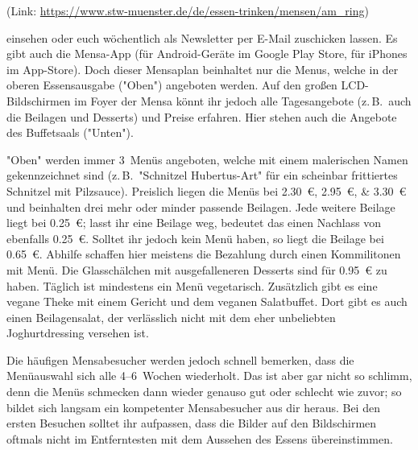 \begin{multicols*}{2}
\begin{center}
	(Link:
	\url{https://www.stw-muenster.de/de/essen-trinken/mensen/am_ring})
\end{center}

einsehen oder euch wöchentlich als Newsletter per E-Mail zuschicken lassen.
Es gibt auch die Mensa-App (für Android-Geräte im Google Play Store, für iPhones im App-Store).
Doch dieser Mensaplan beinhaltet nur die Menus, welche in der oberen Essensausgabe ("Oben") angeboten werden.
Auf den großen LCD-Bildschirmen im Foyer der Mensa könnt ihr jedoch alle Tagesangebote (z.\,B.\ auch die Beilagen und Desserts) und Preise erfahren.
Hier stehen auch die Angebote des Buffetsaals ("Unten").

"Oben" werden immer 3~Menüs angeboten, welche mit einem malerischen Namen gekennzeichnet sind (z.\,B.\ "Schnitzel Hubertus-Art" für ein scheinbar frittiertes Schnitzel mit Pilzsauce).
Preislich liegen die Menüs bei \SIlist{2,30; 2,95; 3,30}{\euro} und beinhalten drei mehr oder minder passende Beilagen.
Jede weitere Beilage liegt bei \SI{0,25}{\euro}; lasst ihr eine Beilage weg, bedeutet das einen Nachlass von ebenfalls \SI{0,25}{\euro}.
Solltet ihr jedoch kein Menü haben, so liegt die Beilage bei \SI{0,65}{\euro}.
Abhilfe schaffen hier meistens die Bezahlung durch einen Kommilitonen mit Menü.
Die Glasschälchen mit ausgefalleneren Desserts sind für \SI{0,95}{\euro} zu haben.
Täglich ist mindestens ein Menü vegetarisch.
Zusätzlich gibt es eine vegane Theke mit einem Gericht und dem veganen Salatbuffet.
Dort gibt es auch einen Beilagensalat, der verlässlich nicht mit dem eher unbeliebten Joghurtdressing versehen ist.

Die häufigen Mensabesucher werden jedoch schnell bemerken, dass die Menüauswahl sich alle 4--6~Wochen wiederholt.
Das ist aber gar nicht so schlimm, denn die Menüs schmecken dann wieder genauso gut oder schlecht wie zuvor; so bildet sich langsam ein kompetenter Mensabesucher aus dir heraus.
Bei den ersten Besuchen solltet ihr aufpassen, dass die Bilder auf den Bildschirmen oftmals nicht im Entferntesten mit dem Aussehen des Essens übereinstimmen.


\end{multicols*}
